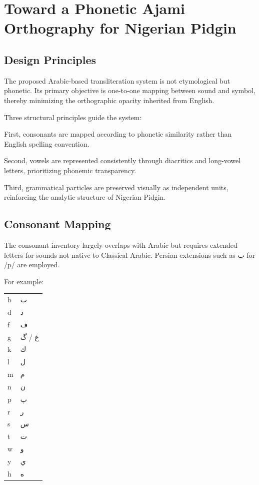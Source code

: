 \documentclass[12pt]{article}
\begin{document}
\section{Toward a Phonetic Ajami Orthography for Nigerian Pidgin}

\subsection{Design Principles}

The proposed Arabic-based transliteration system is not etymological but phonetic. Its primary objective is one-to-one mapping between sound and symbol, thereby minimizing the orthographic opacity inherited from English.

Three structural principles guide the system:

First, consonants are mapped according to phonetic similarity rather than English spelling convention.

Second, vowels are represented consistently through diacritics and long-vowel letters, prioritizing phonemic transparency.

Third, grammatical particles are preserved visually as independent units, reinforcing the analytic structure of Nigerian Pidgin.

\subsection{Consonant Mapping}

The consonant inventory largely overlaps with Arabic but requires extended letters for sounds not native to Classical Arabic. Persian extensions such as پ for /p/ are employed.

For example:

\begin{center}
\begin{tabular}{ll}
b & ب \\
d & د \\
f & ف \\
g & غ / گ \\
k & ك \\
l & ل \\
m & م \\
n & ن \\
p & پ \\
r & ر \\
s & س \\
t & ت \\
w & و \\
y & ي \\
h & ه \\
\end{tabular}
\end{center}
\end{document}
